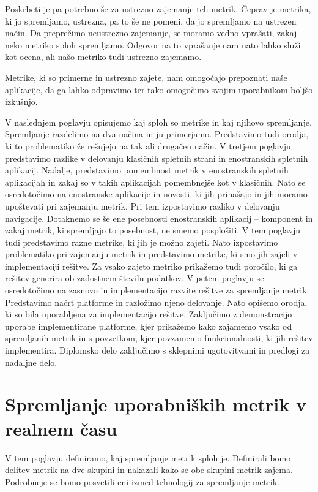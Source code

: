\documentclass[a4paper, 12pt]{book}
\begin{document}
Poskrbeti je pa potrebno še za ustrezno zajemanje teh metrik. Čeprav je metrika, ki jo spremljamo, ustrezna, pa to še ne pomeni, da jo spremljamo na ustrezen način. Da preprečimo neustrezno zajemanje, se moramo vedno vprašati, zakaj neko metriko sploh spremljamo. Odgovor na to vprašanje nam nato lahko služi kot ocena, ali našo metriko tudi ustrezno zajemamo.

Metrike, ki so primerne in ustrezno zajete, nam omogočajo prepoznati  naše aplikacije, da ga lahko odpravimo ter tako omogočimo svojim uporabnikom boljšo izkušnjo.

V naslednjem poglavju opisujemo kaj sploh so metrike in kaj njihovo spremljanje. Spremljanje razdelimo na dva načina in ju primerjamo. Predstavimo tudi orodja, ki to problematiko že rešujejo na tak ali drugačen način. V tretjem poglavju predstavimo razlike v delovanju klasičnih spletnih strani in enostranskih spletnih aplikacij. Nadalje, predstavimo pomembnost metrik v enostranskih spletnih aplikacijah in zakaj so v takih aplikacijah pomembnejše kot v klasičnih. Nato se osredotočimo na enostranske aplikacije in novosti, ki jih prinašajo in jih moramo upoštevati pri zajemanju metrik. Pri tem izpostavimo razliko v delovanju navigacije. Dotaknemo se še ene posebnosti enostranskih aplikacij -- komponent in zakaj metrik, ki spremljajo to posebnost, ne smemo posplošiti. V tem poglavju tudi predstavimo razne metrike, ki jih je možno zajeti. Nato izpostavimo problematiko pri zajemanju metrik in predstavimo metrike, ki smo jih zajeli v implementaciji rešitve. Za vsako zajeto metriko prikažemo tudi poročilo, ki ga rešitev generira ob zadostnem številu podatkov. V petem poglavju se osredotočimo na zasnovo in implementacijo razvite rešitve za spremljanje metrik. Predstavimo načrt platforme in razložimo njeno delovanje. Nato opišemo orodja, ki so bila uporabljena za implementacijo rešitve. Zaključimo z demonstracijo uporabe implementirane platforme, kjer prikažemo kako zajamemo vsako od spremljanih metrik in s povzetkom, kjer povzamemo funkcionalnosti, ki jih rešitev implementira. Diplomsko delo zaključimo s sklepnimi ugotovitvami in predlogi za nadaljne delo.

\chapter{Spremljanje uporabniških metrik v realnem času}
\label{ch0}
V tem poglavju definiramo, kaj spremljanje metrik sploh je. Definirali bomo delitev metrik na dve skupini in nakazali kako se obe skupini metrik zajema. Podrobneje se bomo posvetili eni izmed tehnologij za spremljanje metrik.
\end{document}
